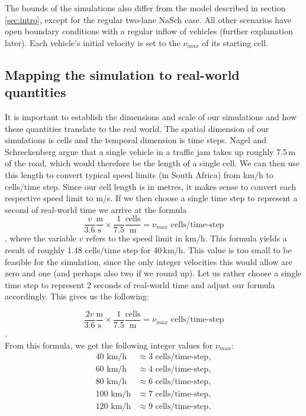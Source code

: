 \documentclass[11pt]{article}
\begin{document}
	The bounds of the simulations also differ from the model described in section \ref{sec:intro}, except for the regular two-lane NaSch case. All other scenarios have open boundary conditions with a regular inflow of vehicles (further explanation later). Each vehicle's initial velocity is set to the $\nu_{max}$ of its starting cell. \\
	
	\subsection{Mapping the simulation to real-world quantities}\label{subsec:quantmap}
	
	It is important to establish the dimensions and scale of our simulations and how these quantities translate to the real world. The spatial dimension of our simulations is cells and the temporal dimension is time steps. Nagel and Schreckenberg argue that a single vehicle in a traffic jam takes up roughly 7.5\,m of the road, which would therefore be the length of a single cell. We can then use this length to convert typical speed limits (in South Africa) from km/h to cells/time step. Since our cell length is in metres, it makes sense to convert each respective speed limit to m/s. If we then choose a single time step to represent a second of real-world time we arrive at the formula
	\[ \frac{v}{3.6} \frac{\text{m}}{\text{s}} \times \frac{1}{7.5} \frac{\text{cells}}{\text{m}} = \nu_{max} \text{ cells/time-step} \],
	where the variable $v$ refers to the speed limit in km/h.
	This formula yields a result of roughly 1.48 cells/time step for 40\,km/h. This value is too small to be feasible for the simulation, since the only integer velocities this would allow are zero and one (and perhaps also two if we round up). Let us rather choose a single time step to represent 2 seconds of real-world time and adjust our formula accordingly. This gives us the following:
	
	\[ \frac{2v}{3.6} \frac{\text{m}}{\text{s}} \times \frac{1}{7.5} \frac{\text{cells}}{\text{m}} = \nu_{max} \text{ cells/time-step} \]. \\
	
	From this formula, we get the following integer values for $\nu_{max}$:
	\begin{align*}
		40 \text{ km/h} &\approx 3 \text{ cells/time-step}, \\
		60 \text{ km/h} &\approx 4 \text{ cells/time-step}, \\
		80 \text{ km/h} &\approx 6 \text{ cells/time-step}, \\
		100 \text{ km/h} &\approx 7 \text{ cells/time-step}, \\
		120 \text{ km/h} &\approx 9 \text{ cells/time-step}. \\
	\end{align*}
\end{document}
